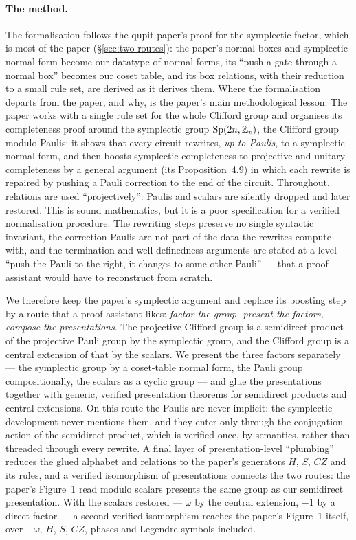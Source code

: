 \paragraph{The method.}
The formalisation follows the qupit paper's proof for the symplectic
factor, which is most of the paper (\S\ref{sec:two-routes}): the
paper's normal boxes and symplectic normal form become our datatype of
normal forms, its ``push a gate through a normal box'' becomes our
coset table, and its box relations, with their reduction to a small
rule set, are derived as it derives them.  Where the formalisation
departs from the paper, and why, is the paper's main methodological
lesson.  The paper works with a single rule set for the whole Clifford
group and organises its completeness proof around the symplectic group
$\mathrm{Sp}(2n,\mathbb{Z}_p)$, the Clifford group modulo Paulis: it shows that every circuit
rewrites, \emph{up to Paulis}, to a symplectic normal form, and then
boosts symplectic completeness to projective and unitary completeness
by a general argument (its Proposition~4.9) in which each rewrite is
repaired by pushing a Pauli correction to the end of the circuit.  Throughout,
relations are used ``projectively'': Paulis and scalars are silently
dropped and later restored.  This is sound mathematics, but it is a
poor specification for a verified normalisation procedure.  The
rewriting steps preserve no single syntactic invariant,
the correction Paulis are not part of the data the rewrites compute
with, and the termination and well-definedness arguments are stated at a
level --- ``push the Pauli to the right, it changes to some other
Pauli'' --- that a proof assistant would have to reconstruct from
scratch.

We therefore keep the paper's symplectic argument and replace its
boosting step by a route that a proof assistant likes: \emph{factor
the group, present the factors, compose the presentations}.  The
projective Clifford group is a semidirect product of the projective
Pauli group by the symplectic group, and the Clifford group is a central
extension of that by the scalars.  We present the three factors
separately --- the symplectic group by a coset-table normal form, the
Pauli group compositionally, the scalars as a cyclic group --- and glue
the presentations together with generic, verified presentation theorems
for semidirect products and central extensions.  On this route the
Paulis are never implicit: the symplectic development never mentions
them, and they enter only through the conjugation action of the
semidirect product, which is verified once, by semantics, rather than
threaded through every rewrite.  A final layer of presentation-level
``plumbing'' reduces the glued alphabet and relations to the paper's
generators $H$, $S$, $CZ$ and its rules, and a verified isomorphism of
presentations connects the two routes: the paper's Figure~1 read modulo
scalars presents the same group as our semidirect presentation.  With
the scalars restored --- $\omega$ by the central extension, $-1$ by a
direct factor --- a second verified isomorphism reaches the paper's
Figure~1 itself, over $-\omega$, $H$, $S$, $CZ$, phases and Legendre
symbols included.

